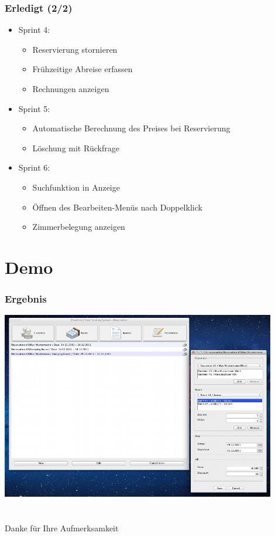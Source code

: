 \documentclass{beamer}
\begin{document}
\begin{frame}
\frametitle{Erledigt (2/2)} 
\begin{itemize}
\item  Sprint 4:
\begin{itemize}
\item  Reservierung stornieren
\item  Fr\"uhzeitige Abreise erfassen
\item  Rechnungen anzeigen
\end{itemize}
\item  Sprint 5:
\begin{itemize}
\item  Automatische Berechnung des Preises bei Reservierung
\item  L\"oschung mit R\"uckfrage
\end{itemize}
\item  Sprint 6:
\begin{itemize}
\item  Suchfunktion in Anzeige
\item  \"Offnen des Bearbeiten-Men\"us nach Doppelklick
\item  Zimmerbelegung anzeigen
\end{itemize}
\end{itemize}
\end{frame}

\section{Demo} 

\begin{frame}
\frametitle{Ergebnis} 
\begin{overprint}
\begin{center}
\includegraphics [width=0.9\textwidth] {img/demo.png}
\end{center}
\end{overprint}
\end{frame}

\section{} 

\begin{frame}
\begin{center}
Danke f\"ur Ihre Aufmerksamkeit
\end{center}
\end{frame}
\end{document}
